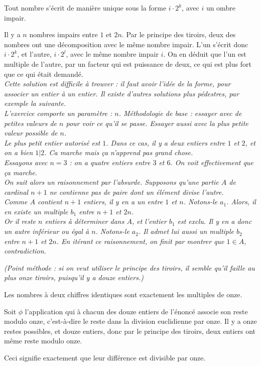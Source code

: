 \begin{Soln}{13}

Tout nombre s'écrit de manière unique sous la forme $i \cdot 2^k$, avec $i$ un ombre impair.

Il y a $n$ nombres impairs entre $1$ et $2n$. Par le principe des tiroirs, deux des nombres ont une décomposition avec le même nombre impair. L'un s'écrit donc $i\cdot 2^k$, et l'autre, $i\cdot 2^l$, avec le même nombre impair $i$. On en déduit que l'un est multiple de l'autre, par un facteur qui est puissance de deux, ce qui est plus fort que ce qui était demandé.\\

\emph{Cette solution est difficile à trouver : il faut avoir l'idée de la forme, pour associer un entier à un entier. Il existe d'autres solutions plus pédestres, par exemple la suivante.\\
L'exercice comporte un paramètre : $n$. Méthodologie de base : essayer avec de petites valeurs de $n$ pour voir ce qu'il se passe.  Essayer aussi avec la plus petite valeur possible de $n$.\\
Le plus petit entier autorisé est $1$. Dans ce cas, il y a deux entiers entre $1$ et $2$, et on a bien $1|2$. Ca marche mais ça n'apprend pas grand chose.\\
Essayons avec $n=3$ : on a quatre entiers entre $3$ et $6$. On voit effectivement que ça marche.\\
On suit alors un raisonnement par l'absurde. Supposons qu'une partie $A$ de cardinal $n+1$ ne contienne pas de paire dont un élément divise l'autre.\\
Comme $A$ contient  $n+1$ entiers, il y en a un entre $1$ et $n$. Notons-le $a_1$. Alors, il en existe un multiple $b_1$ entre $n+1$ et $2n$.\\
Or il reste $n$ entiers à déterminer dans $A$, et l'entier $b_1$ est exclu. Il y en a donc un autre inférieur ou égal à $n$. Notons-le $a_2$. Il admet lui aussi un multiple $b_2$ entre $n+1$ et $2n$. En itérant ce raisonnement, on finit par montrer que $1\in A$, contradiction.}
\end{Soln}
\begin{Soln}{14}
\emph{(Point méthode : si on veut utiliser le principe des tiroirs, il semble qu'il faille au plus onze \og tiroirs\fg, puisqu'il y a douze entiers.)}


Les nombres à deux chiffres identiques sont exactement les multiples de onze.

Soit $\phi$ l'application qui à chacun des douze entiers de l'énoncé associe son reste modulo onze, c'est-à-dire le reste dans la division euclidienne par onze. Il y a onze restes possibles, et douze entiers, donc par le principe des tiroirs, deux entiers ont même reste modulo onze.

Ceci signifie exactement que leur différence est divisible par onze.


\end{Soln}
